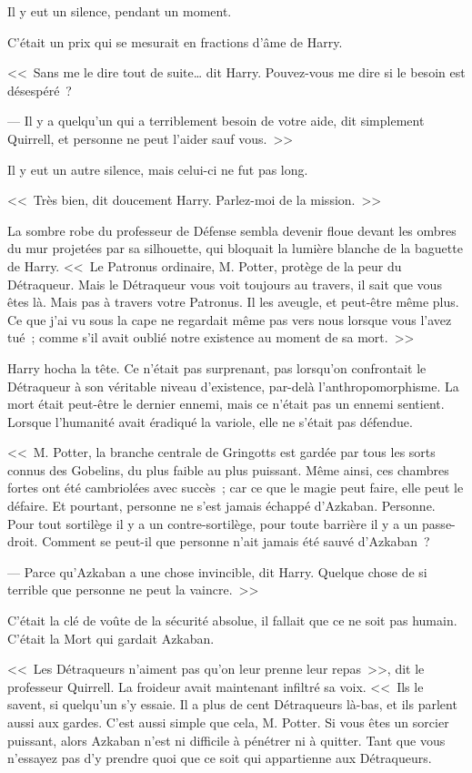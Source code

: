 Il y eut un silence, pendant un moment.

C'était un prix qui se mesurait en fractions d'âme de Harry.

<<~Sans me le dire tout de suite… dit Harry. Pouvez-vous me dire si le besoin est désespéré~?

--- Il y a quelqu'un qui a terriblement besoin de votre aide, dit simplement Quirrell, et personne ne peut l'aider sauf vous.~>>

Il y eut un autre silence, mais celui-ci ne fut pas long.

<<~Très bien, dit doucement Harry. Parlez-moi de la mission.~>>

La sombre robe du professeur de Défense sembla devenir floue devant les ombres du mur projetées par sa silhouette, qui bloquait la lumière blanche de la baguette de Harry. <<~Le Patronus ordinaire, M. Potter, protège de la peur du Détraqueur. Mais le Détraqueur vous voit toujours au travers, il sait que vous êtes là. Mais pas à travers votre Patronus. Il les aveugle, et peut-être même plus. Ce que j'ai vu sous la cape ne regardait même pas vers nous lorsque vous l'avez tué~; comme s'il avait oublié notre existence au moment de sa mort.~>>

Harry hocha la tête. Ce n'était pas surprenant, pas lorsqu'on confrontait le Détraqueur à son véritable niveau d'existence, par-delà l'anthropomorphisme. La mort était peut-être le dernier ennemi, mais ce n'était pas un ennemi sentient. Lorsque l'humanité avait éradiqué la variole, elle ne s'était pas défendue.

<<~M. Potter, la branche centrale de Gringotts est gardée par tous les sorts connus des Gobelins, du plus faible au plus puissant. Même ainsi, ces chambres fortes ont été cambriolées avec succès~; car ce que le magie peut faire, elle peut le défaire. Et pourtant, personne ne s'est jamais échappé d'Azkaban. Personne. Pour tout sortilège il y a un contre-sortilège, pour toute barrière il y a un passe-droit. Comment se peut-il que personne n'ait jamais été sauvé d'Azkaban~?

--- Parce qu'Azkaban a une chose invincible, dit Harry. Quelque chose de si terrible que personne ne peut la vaincre.~>>

C'était la clé de voûte de la sécurité absolue, il fallait que ce ne soit pas humain. C'était la Mort qui gardait Azkaban.

<<~Les Détraqueurs n'aiment pas qu'on leur prenne leur repas~>>, dit le professeur Quirrell. La froideur avait maintenant infiltré sa voix. <<~Ils le savent, si quelqu'un s'y essaie. Il a plus de cent Détraqueurs là-bas, et ils parlent aussi aux gardes. C'est aussi simple que cela, M. Potter. Si vous êtes un sorcier puissant, alors Azkaban n'est ni difficile à pénétrer ni à quitter. Tant que vous n'essayez pas d'y prendre quoi que ce soit qui appartienne aux Détraqueurs.

